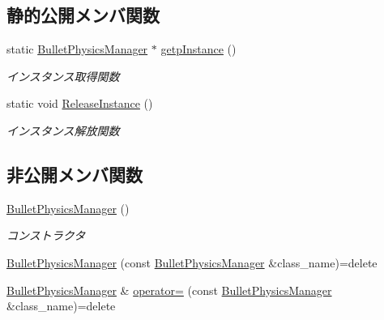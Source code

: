 \subsection*{静的公開メンバ関数}
\begin{DoxyCompactItemize}
\item 
static \mbox{\hyperlink{class_bullet_physics_manager}{Bullet\+Physics\+Manager}} $\ast$ \mbox{\hyperlink{class_bullet_physics_manager_a7ac6a8bba52b259931695ae85ded80d1}{getp\+Instance}} ()
\begin{DoxyCompactList}\small\item\em インスタンス取得関数 \end{DoxyCompactList}\item 
static void \mbox{\hyperlink{class_bullet_physics_manager_a10b55190182029ac95365e4f52dd1758}{Release\+Instance}} ()
\begin{DoxyCompactList}\small\item\em インスタンス解放関数 \end{DoxyCompactList}\end{DoxyCompactItemize}
\subsection*{非公開メンバ関数}
\begin{DoxyCompactItemize}
\item 
\mbox{\hyperlink{class_bullet_physics_manager_afb44166d940d7c4cf0fbdd9ea35a81f6}{Bullet\+Physics\+Manager}} ()
\begin{DoxyCompactList}\small\item\em コンストラクタ \end{DoxyCompactList}\item 
\mbox{\hyperlink{class_bullet_physics_manager_a58a76106be19bb7bd11be0642281742a}{Bullet\+Physics\+Manager}} (const \mbox{\hyperlink{class_bullet_physics_manager}{Bullet\+Physics\+Manager}} \&class\+\_\+name)=delete
\item 
\mbox{\hyperlink{class_bullet_physics_manager}{Bullet\+Physics\+Manager}} \& \mbox{\hyperlink{class_bullet_physics_manager_a179d9a6da3f1b96efbe091419968b53c}{operator=}} (const \mbox{\hyperlink{class_bullet_physics_manager}{Bullet\+Physics\+Manager}} \&class\+\_\+name)=delete
\end{DoxyCompactItemize}
